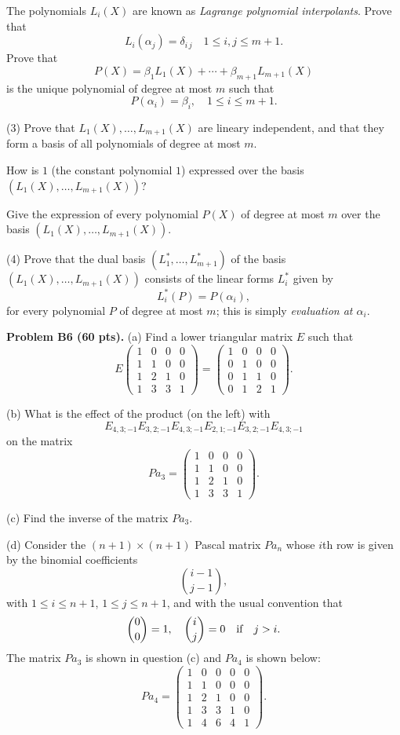 \documentclass[12pt]{article}
\begin{document}
The polynomials $L_i(X)$ are known as 
{\it Lagrange polynomial interpolants\/}.
Prove that
\[
L_i(\alpha_j) = \delta_{i\, j} \quad 1\leq i, j \leq m + 1.
\]
Prove that
\[
P(X) = \beta_1L_1(X) + \cdots + \beta_{m + 1} L_{m + 1}(X)
\]
is the unique polynomial of degree at most $m$ such that
\[
P(\alpha_i) = \beta_i, \quad 1\leq i \leq m + 1. 
\]

\medskip
(3)
Prove that $L_1(X), \dots, L_{m + 1}(X)$ are lineary independent, and that
they form a basis of all polynomials of degree at most $m$.

\medskip
How is $1$ (the constant polynomial $1$)
expressed over the basis $(L_1(X), \dots, L_{m + 1}(X))$?

\medskip
Give the expression of every polynomial $P(X)$ of degree at most $m$ over
the basis $(L_1(X), \dots, L_{m + 1}(X))$.

\medskip
(4)
Prove that the dual basis $(L_1^*, \dots, L_{m + 1}^*)$
of the basis $(L_1(X), \dots, L_{m + 1}(X))$ consists of the linear forms
$L_i^*$ given by
\[
L_i^*(P) = P(\alpha_i),
\]
for every polynomial $P$ of degree at most $m$;
this is simply {\it evaluation at $\alpha_i$\/}.

\vspace {0.25cm}\noindent
{\bf Problem B6 (60 pts).}
(a)
Find a lower triangular matrix $E$ such that
\[
E 
\begin{pmatrix}
1 & 0 & 0 & 0 \\
1 & 1 & 0 & 0 \\
1 & 2 & 1 & 0 \\
1 & 3 & 3 & 1
\end{pmatrix}
=
\begin{pmatrix}
1 & 0 & 0 & 0 \\
0 & 1 & 0 & 0 \\
0 & 1 & 1 & 0 \\
0 & 1 & 2 & 1 
\end{pmatrix}.
\]

\medskip
(b)
What is the effect of the product (on the left) with
\[
E_{4, 3; -1} E_{3, 2; -1} E_{4, 3; -1} E_{2, 1; -1} E_{3, 2; -1} E_{4, 3; -1}
\]
on the matrix 
\[
Pa_3 = 
\begin{pmatrix}
1 & 0 & 0 & 0 \\
1 & 1 & 0 & 0 \\
1 & 2 & 1 & 0 \\
1 & 3 & 3 & 1
\end{pmatrix}.
\]

\medskip
(c)
Find the inverse of the matrix $Pa_3$.

\medskip
(d)
Consider the $(n+1)\times (n+1)$ Pascal matrix $Pa_{n}$
whose $i$th row is given by the binomial coefficients
\[
\binom{i-1}{j-1},
\]
with $1 \leq i \leq n + 1$, $1 \leq j \leq n + 1$,
and with the usual convention that
\[
\binom{0}{0} = 1, \quad \binom{i}{j} = 0 
\quad\hbox{if}\quad j > i.
\]
The matrix $Pa_3$ is shown in question (c) and $Pa_4$ is shown below:
\[
Pa_4 = 
\begin{pmatrix}
1 & 0 & 0 & 0 & 0\\
1 & 1 & 0 & 0 & 0 \\
1 & 2 & 1 & 0 & 0 \\
1 & 3 & 3 & 1 & 0 \\
1 & 4 & 6 & 4 & 1
\end{pmatrix}.
\]
\end{document}
